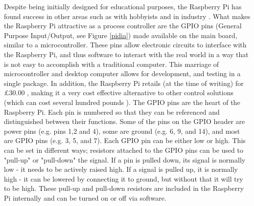 \documentclass[twoside,a4]{report}
\def\br{\newline \newline \noindent}
\begin{document}
	Despite being initially designed for educational purposes, the Raspberry Pi has found success in other areas such as with hobbyists \cite{pihobbynotedu} and in industry \cite{pimorethanedu}. What makes the Raspberry Pi attractive as a process controller are the GPIO pins (General Purpose Input/Output, see Figure \ref{pidia}) made available on the main board, similar to a microcontroller. These pins allow electronic circuits to interface with the Raspberry Pi, and thus software to interact with the real world in a way that is not easy to accomplish with a traditional computer. This marriage of microcontroller and desktop computer allows for development, and testing in a single package. In addition, the Raspberry Pi retails (at the time of writing) for \pounds 30.00 \cite{picost}, making it a very cost effective alternative to other control solutions (which can cost several hundred pounds \cite{otherpcucost}). \br
	The GPIO pins are the heart of the Raspberry Pi. Each pin is numbered so that they can be referenced and distinguished between their functions. Some of the pins on the GPIO header are power pins (e.g.  pins 1,2 and 4), some are ground (e.g. 6, 9, and 14), and most are GPIO pins (e.g. 3, 5, and 7). Each GPIO pin can be either low or high. This can be set in different ways; resistors attached to the GPIO pins can be used to "pull-up" or "pull-down" the signal. If a pin is pulled down, its signal is normally low - it needs to be actively raised high. If a signal is pulled up, it is normally high - it can be lowered by connecting it to ground, but without that it will try to be high. These pull-up and pull-down resistors are included in the Raspberry Pi internally and can be turned on or off via software. \newline
\end{document}
